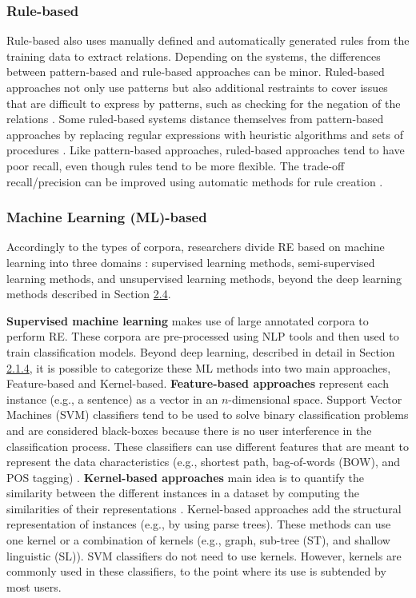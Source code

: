 \subsubsection{Rule-based}

Rule-based also uses manually defined and automatically generated rules from the training data to extract relations. Depending on the systems, the differences between pattern-based and rule-based approaches can be minor. 
Ruled-based approaches not only use patterns but also additional restraints to cover issues that are difficult to express by patterns, such as checking for the negation of the relations \citep{koike2005automatic}. Some ruled-based systems distance themselves from pattern-based approaches by replacing regular expressions with heuristic algorithms and sets of procedures \citep{rinaldi2007mining}. Like pattern-based approaches, ruled-based approaches tend to have poor recall, even though rules tend to be more flexible. The trade-off recall/precision can be improved using automatic methods for rule creation \citep{xu2012feature}.


\subsubsection{Machine Learning (ML)-based}

Accordingly to the types of corpora, researchers divide RE based on machine learning into three domains \citep{zhang2017review}: supervised learning methods, semi-supervised learning methods, and unsupervised learning methods, beyond the deep learning methods described in Section \hyperlink{2.4}{2.4}. 

\textbf{Supervised machine learning }makes use of large annotated corpora to perform RE. These corpora are pre-processed using NLP tools and then used to train classification models. Beyond deep learning, described in detail in Section \hyperlink{2.1.4}{2.1.4}, it is possible to categorize these ML methods into two main approaches, Feature-based and Kernel-based. \textbf{Feature-based approaches} represent each instance (e.g., a sentence) as a vector in an $n$-dimensional space. Support Vector Machines (SVM) classifiers tend to be used to solve binary classification problems and are considered black-boxes because there is no user interference in the classification process. These classifiers can use different features that are meant to represent the data characteristics (e.g., shortest path, bag-of-words (BOW), and POS tagging) \citep{kim2008detection}. \textbf{Kernel-based approaches} main idea is to quantify the similarity between the different instances in a dataset by computing the similarities of their representations \citep{giuliano2006exploiting}. Kernel-based approaches add the structural representation of instances (e.g., by using parse trees). These methods can use one kernel or a combination of kernels (e.g., graph, sub-tree (ST), and shallow linguistic (SL)). SVM classifiers do not need to use kernels. However, kernels are commonly used in these classifiers, to the point where its use is subtended by most users. 


